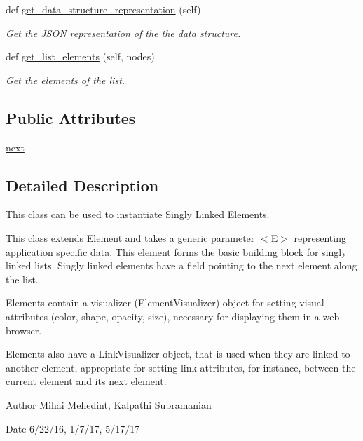 \begin{DoxyCompactItemize}
\item 
def \mbox{\hyperlink{class_bridges_1_1sl__element_1_1_s_lelement_a840ee42b8296ef3380771aac60d352c3}{get\+\_\+data\+\_\+structure\+\_\+representation}} (self)
\begin{DoxyCompactList}\small\item\em Get the J\+S\+ON representation of the the data structure. \end{DoxyCompactList}\item 
def \mbox{\hyperlink{class_bridges_1_1sl__element_1_1_s_lelement_ac25a593141f89b0ca10ce2a083bac309}{get\+\_\+list\+\_\+elements}} (self, nodes)
\begin{DoxyCompactList}\small\item\em Get the elements of the list. \end{DoxyCompactList}\end{DoxyCompactItemize}
\subsection*{Public Attributes}
\begin{DoxyCompactItemize}
\item 
\mbox{\hyperlink{class_bridges_1_1sl__element_1_1_s_lelement_a96a8af8acbfe6f35cfdd1fd8ab16281d}{next}}
\end{DoxyCompactItemize}


\subsection{Detailed Description}
This class can be used to instantiate Singly Linked Elements. 

This class extends Element and takes a generic parameter $<$\+E$>$ representing application specific data. This element forms the basic building block for singly linked lists. Singly linked elements have a field pointing to the next element along the list.

\begin{DoxyVerb}Elements contain a visualizer (ElementVisualizer) object for setting visual
attributes (color, shape, opacity, size), necessary for displaying them in a
web browser.

Elements also have a LinkVisualizer object, that is used when they are linked to
another element, appropriate for setting link attributes, for instance, between
the current element and its next element.
\end{DoxyVerb}


\begin{DoxyAuthor}{Author}
Mihai Mehedint, Kalpathi Subramanian
\end{DoxyAuthor}
\begin{DoxyDate}{Date}
6/22/16, 1/7/17, 5/17/17
\end{DoxyDate}

